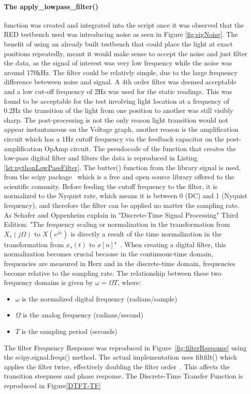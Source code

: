 \paragraph{The apply\_lowpass\_filter()} function was created and integrated into the script once it was observed that the RED testbench used was introducing noise as seen in Figure \ref{fig:sigNoise}. The benefit of using an already built testbench that could place the light at exact positions repeatedly, meant it would make sense to accept the noise and just filter the data, as the signal of interest was very low frequency while the noise was around 170kHz. The filter could be relativly simple, due to the large frequency difference beteween noise and signal. A 4th order filter was deemed acceptable and a low cut-off frequency of 2Hz was used for the static readings. This was found to be acceptable for the test involving light location at a frequency of 0.2Hz the transition of the light from one position to another was still visibly sharp. The post-processing is not the only reason light transition would not appear instantaneous on the Voltage graph, another reason is the amplification circuit which has a 1Hz cutoff frequency via the feedback capacitor on the post-amplification OpAmp circuit. 
The pseudocode of the function that creates the low-pass digital filter and filters the data is reproduced in Listing \ref{lst:pythonLowPassFilter}. The butter() function from the library signal is used, from the scipy package~\cite{RefWorks:butter} which is a free and open source library offered to the scientific comunity. Before feeding the cutoff frequency to the filter, it is normalized to the Nyquist rate, which means it is between 0 (DC) and 1 (Nyquist frequency), and therefore the filter can be applied no matter the sampling rate. As Schafer and Oppenheim explain in "Discrete-Time Signal Processing" Third Edition:
"The frequency scaling or normalization in the transformation from $ X_s(j\Omega) \text{ to } X(e^{j\omega})$ is directly a result of the time normalization in the transformation from $x_s(t) \text{ to } x[n]$"~\cite[p.171]{RefWorks:oppenheim2013discrete-time}.
When creating a digital filter, this normalization becomes crucial because in the continuous-time domain, frequencies are measured in Herz and in the discrete-time domain, frequencies become relative to the sampling rate.
The relationship between these two frequency domains is given by $\omega = \Omega T$, where:

\begin{itemize}
    \item $\omega$ is the normalized digital frequency (radians/sample)
    \item $\Omega$ is the analog frequency (radians/second)
    \item $T$ is the sampling period (seconds)
\end{itemize}
The filter Frequency Response was reproduced in Figure~\ref{fig:filterResponse} using the scipy.signal.freqz() method. The actual implementation uses filtfilt() which applies the filter twice, effectively doubling the filter order~\cite{RefWorks:2025filtfilt}. This affects the transition steepness and phase response. The Discrete-Time Transfer Function is reproduced in Figure\ref{DTFT-TF}

